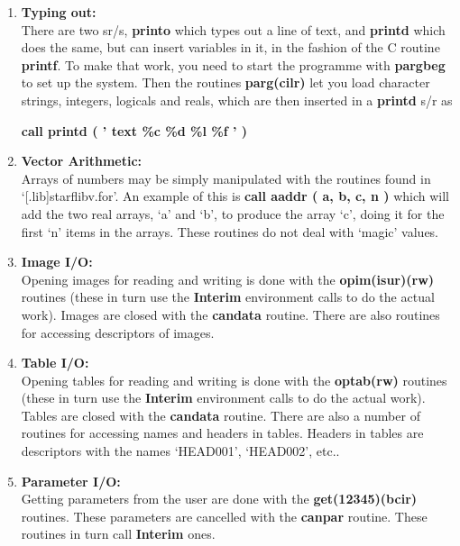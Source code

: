 \begin{enumerate}

\item {\bf Typing out: \\ }
       There are two sr/s, {\bf printo} which
      types out a line of text, and {\bf printd} which does the same, but can
      insert variables in it, in the fashion of the C routine {\bf printf}.
      To make that work, you need to start the programme with {\bf pargbeg}
      to set up the system. Then the routines {\bf parg(cilr)} let you load
      character strings, integers, logicals and reals, which are then
      inserted in a {\bf printd} s/r as 

       \hspace*{\fill}  {\bf call printd ( ' text \%c \%d \%l \%f ' ) }  \hspace*{\fill}  

\item {\bf Vector Arithmetic: \\ } 
      Arrays of numbers may be 
      simply manipulated with the routines found in `[.lib]starflibv.for'. 
      An example of this is {\bf call aaddr ( a, b, c, n )} which will add
      the two real arrays, `a' and `b', to produce the array `c', doing it for 
      the first `n' items in the arrays. These routines do not deal with 
      `magic' values.

\item {\bf Image I/O: \\ } 
      Opening images for reading and writing 
      is done with the {\bf opim(isur)(rw)} routines (these in turn use the
      {\bf Interim} environment calls to do the actual work). Images are closed 
      with the {\bf candata } routine. There are also routines for
      accessing descriptors of images.

\item {\bf Table I/O: \\ }
      Opening tables for reading and writing 
      is done with the {\bf optab(rw)} routines (these in turn use the
      {\bf Interim} environment calls to do the actual work). Tables are closed 
      with the {\bf candata } routine. There are also a number of routines
      for accessing names and headers in tables. Headers in tables are
      descriptors with the names `HEAD001', `HEAD002', etc..

\item {\bf Parameter I/O: \\ }
       Getting parameters from the
      user are done with the {\bf get(12345)(bcir)} routines. These 
      parameters are cancelled with the {\bf canpar} routine. These 
      routines in turn call {\bf Interim} ones.


\end{enumerate}
